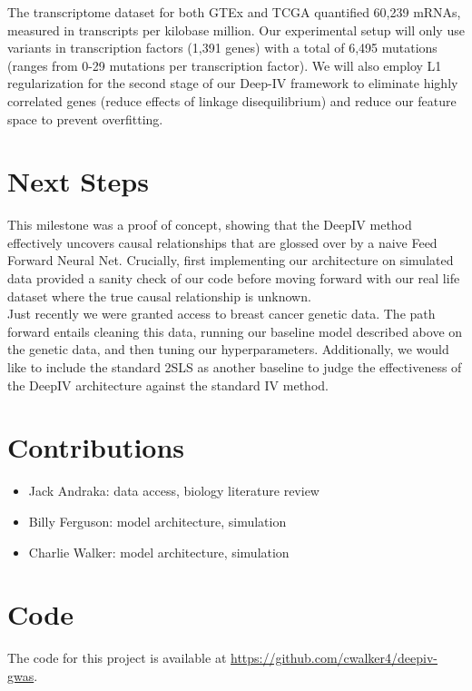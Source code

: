 \documentclass[10.5pt, oneside, twocolumn]{article}   	%
\begin{document}
 The transcriptome dataset for both GTEx and TCGA quantified 60,239 mRNAs, measured in transcripts per kilobase million. Our experimental setup will only use variants in transcription factors (1,391 genes) with a total of 6,495 mutations (ranges from 0-29 mutations per transcription factor). We will also employ L1 regularization for the second stage of our Deep-IV framework to eliminate highly correlated genes (reduce effects of linkage disequilibrium) and reduce our feature space to prevent overfitting.

\section{Next Steps}
This milestone was a proof of concept, showing that the DeepIV method effectively uncovers causal relationships that are glossed over by a naive Feed Forward Neural Net. Crucially, first implementing our architecture on simulated data provided a sanity check of our code before moving forward with our real life dataset where the true causal relationship is unknown.\\

Just recently we were granted access to breast cancer genetic data. The path forward entails cleaning this data, running our baseline model described above on the genetic data, and then tuning our hyperparameters. Additionally, we would like to include the standard 2SLS as another baseline to judge the effectiveness of the DeepIV architecture against the standard IV method. 

\section{Contributions}
\begin{itemize}
\item Jack Andraka: data access, biology literature review\\
\item Billy Ferguson: model architecture, simulation\\
\item Charlie Walker: model architecture, simulation
\end{itemize}

\section{Code}
The code for this project is available at \url{https://github.com/cwalker4/deepiv-gwas}.
\end{document}
